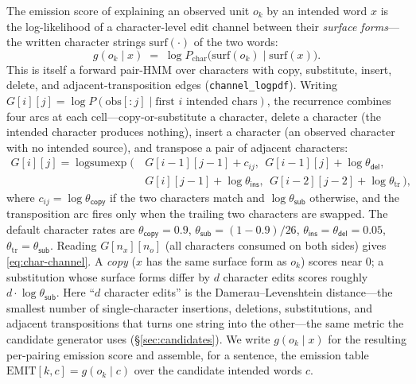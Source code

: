 \documentclass[11pt]{article}
\providecommand{\given}{\mid}
\providecommand{\copyact}{\textsf{copy}}
\providecommand{\subact}{\textsf{sub}}
\providecommand{\insact}{\textsf{ins}}
\providecommand{\delact}{\textsf{del}}
\providecommand{\lse}{\operatorname{logsumexp}}
\providecommand{\code}[1]{\texttt{#1}}
\providecommand{\chan}{g}            %
\begin{document}
The emission score of explaining an observed unit $o_k$ by an intended word $x$ is the log-likelihood of a character-level edit channel between their \emph{surface forms}---the written character strings $\mathrm{surf}(\cdot)$ of the two words:
\begin{equation}\label{eq:char-channel}
  \chan(o_k \given x) \;=\; \log P_{\mathrm{char}}\!\big(\mathrm{surf}(o_k) \given \mathrm{surf}(x)\big).
\end{equation}
This is itself a forward pair-HMM over characters with copy, substitute, insert, delete, and adjacent-transposition edges (\code{channel\_logpdf}). Writing $G[i][j] = \log P(\mathrm{obs}[:j]\given \text{first } i \text{ intended chars})$, the recurrence combines four arcs at each cell---copy-or-substitute a character, delete a character (the intended character produces nothing), insert a character (an observed character with no intended source), and transpose a pair of adjacent characters:
\begin{equation}\label{eq:char-dp}
\begin{split}
  G[i][j] = \lse\big(\, & G[i{-}1][j{-}1] + c_{ij},\ \ G[i{-}1][j] + \log\theta_{\delact}, \\
                        & G[i][j{-}1] + \log\theta_{\insact},\ \ G[i{-}2][j{-}2] + \log\theta_{\mathrm{tr}}\,\big),
\end{split}
\end{equation}
where $c_{ij} = \log\theta_{\copyact}$ if the two characters match and $\log\theta_{\subact}$ otherwise, and the transposition arc fires only when the trailing two characters are swapped. The default character rates are $\theta_{\copyact} = 0.9$, $\theta_{\subact} = (1-0.9)/26$, $\theta_{\insact}=\theta_{\delact}=0.05$, $\theta_{\mathrm{tr}}=\theta_{\subact}$. Reading $G[n_x][n_o]$ (all characters consumed on both sides) gives \eqref{eq:char-channel}. A \emph{copy} ($x$ has the same surface form as $o_k$) scores near $0$; a substitution whose surface forms differ by $d$ character edits scores roughly $d\cdot\log\theta_{\subact}$. Here ``$d$ character edits'' is the Damerau--Levenshtein distance---the smallest number of single-character insertions, deletions, substitutions, and adjacent transpositions that turns one string into the other---the same metric the candidate generator uses (\S\ref{sec:candidates}). We write $\chan(o_k\given x)$ for the resulting per-pairing emission score and assemble, for a sentence, the emission table $\mathrm{EMIT}[k, c] = \chan(o_k \given c)$ over the candidate intended words $c$.
\end{document}
